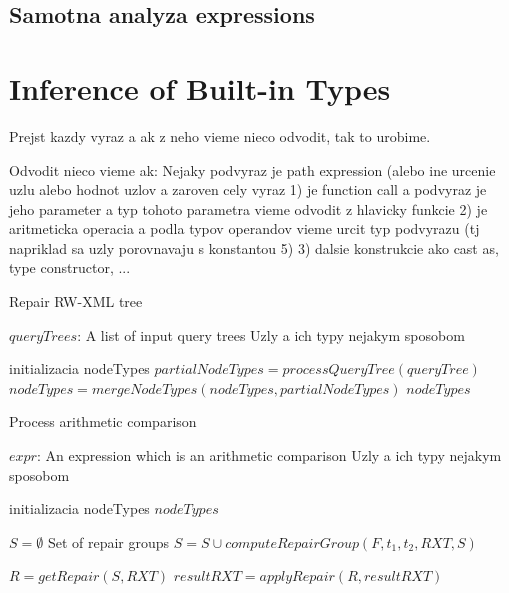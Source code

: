 \subsection{Samotna analyza expressions}

\section{Inference of Built-in Types}
Prejst kazdy vyraz a ak z neho vieme nieco odvodit, tak to urobime.

Odvodit nieco vieme ak:
Nejaky podvyraz je path expression (alebo ine urcenie uzlu alebo hodnot uzlov 
a zaroven cely vyraz
1) je function call a podvyraz je jeho parameter a typ tohoto parametra vieme odvodit z hlavicky funkcie
2) je aritmeticka operacia a podla typov operandov vieme urcit typ podvyrazu (tj napriklad sa uzly porovnavaju s konstantou 5) 
3) dalsie konstrukcie ako cast as, type constructor, ... 



\begin{algorithm}
\caption{Repair RW-XML tree}
\label{propAlgo}
\begin{algorithmic}[1]
\REQUIRE $queryTrees$: A list of input query trees
\ENSURE Uzly a ich typy nejakym sposobom

\STATE initializacia nodeTypes
    \STATE $partialNodeTypes = processQueryTree(queryTree)$
    \STATE $nodeTypes = mergeNodeTypes(nodeTypes, partialNodeTypes)$
\ENDFOR
\RETURN $nodeTypes$
\end{algorithmic}
\end{algorithm}

\begin{algorithm}
\caption{Process arithmetic comparison}
\label{algorithm_process_arithmetic comparison}
\begin{algorithmic}[1]
\REQUIRE $expr$: An expression which is an arithmetic comparison
\ENSURE Uzly a ich typy nejakym sposobom

\STATE initializacia nodeTypes
\RETURN $nodeTypes$


    \STATE $S = \emptyset$ \COMMENT Set of repair groups
		    \STATE $S = S \cup computeRepairGroup(F, t_1, t_2, RXT, S)$
	    \ENDFOR
    \ENDFOR

    \STATE $R = getRepair(S, RXT)$
    \STATE $resultRXT = applyRepair(R, resultRXT)$
\ENDWHILE
\end{algorithmic}
\end{algorithm}